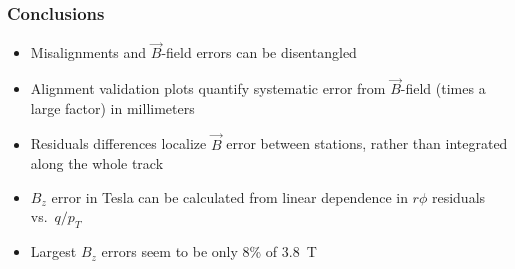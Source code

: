 \documentclass[compress]{beamer}
\begin{document}
\begin{frame}
\frametitle{Conclusions}
\begin{itemize}\setlength{\itemsep}{0.5 cm}
\item Misalignments and $\vec{B}$-field errors can be disentangled
\item Alignment validation plots quantify systematic error from $\vec{B}$-field (times a large factor) in millimeters
\item Residuals differences localize $\vec{B}$ error between stations, rather than integrated along the whole track
\item $B_z$ error in Tesla can be calculated from linear dependence in $r\phi$ residuals vs.\ $q/p_T$
\item Largest $B_z$ errors seem to be only 8\% of 3.8~T
\end{itemize}
\label{numpages}
\end{frame}
\end{document}
